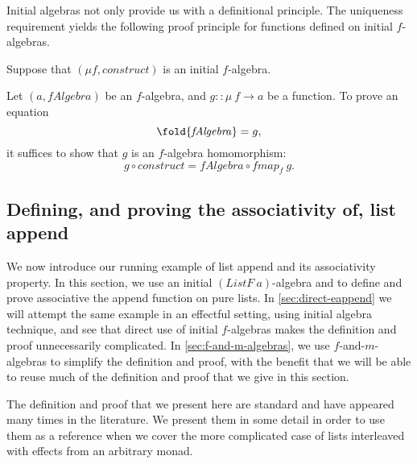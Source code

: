 Initial algebras not only provide us with a definitional
principle. The uniqueness requirement yields the following proof
principle for functions defined on initial $f$-algebras.

\begin{proofprinciple}\label{pp:initial-alg}
  Suppose that $(\mu f, \mathit{construct})$ is an initial $f$-algebra.

  Let $(a, \mathit{fAlgebra})$ be an $f$-algebra, and $g :: \mu~f \to
  a$ be a function. To prove an equation
  \begin{displaymath}
    \fold{\mathit{fAlgebra}} = g,
  \end{displaymath}
  it suffices to show that $g$ is an $f$-algebra homomorphism:
  \begin{displaymath}
    g \circ \mathit{construct} = \mathit{fAlgebra} \circ \mathit{fmap}_f~g.
  \end{displaymath}
\end{proofprinciple}

\subsection{Defining, and proving the associativity of, list append}
\label{sec:pure-append}

We now introduce our running example of list append and its
associativity property. In this section, we use an initial
$(\mathit{ListF}~a)$-algebra and  to
define and prove associative the append function on pure lists. In
\autoref{sec:direct-eappend} we will attempt the same example in an
effectful setting, using initial algebra technique, and see that
direct use of initial $f$-algebras makes the definition and proof
unnecessarily complicated. In \autoref{sec:f-and-m-algebras}, we use
$f$-and-$m$-algebras to simplify the definition and proof, with the
benefit that we will be able to reuse much of the definition and proof
that we give in this section.

The definition and proof that we present here are standard and have
appeared many times in the literature. We present them in some detail
in order to use them as a reference when we cover the more complicated
case of lists interleaved with effects from an arbitrary monad.

